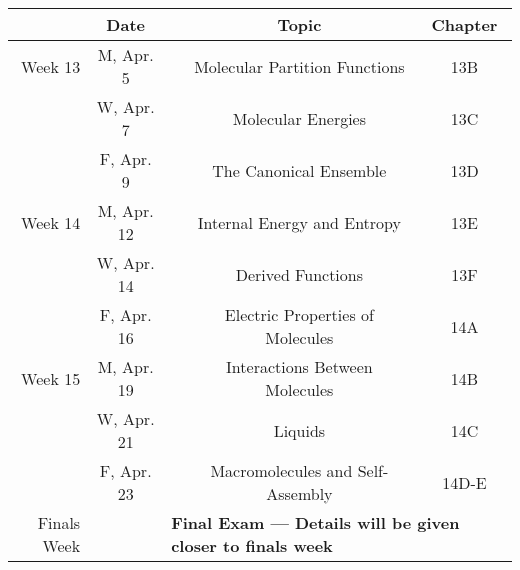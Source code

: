 \documentclass[12pt, letterpaper]{article}
\begin{document}
\noindent
\begin{tabular}{rcccc}
	& Date && Topic & Chapter\\
	\midrule
	Week 13 & M, Apr. 5&& Molecular Partition Functions & 13B\\
	& W, Apr. 7&& Molecular Energies & 13C\\
	& F, Apr. 9&& The Canonical Ensemble & 13D\\
	\midrule
	Week 14 & M, Apr. 12&& Internal Energy and Entropy & 13E\\
	& W, Apr. 14&& Derived Functions & 13F\\
	& F, Apr. 16&& Electric Properties of Molecules & 14A\\
	\midrule
	Week 15 & M, Apr. 19&& Interactions Between Molecules & 14B\\
	& W, Apr. 21&& Liquids & 14C\\
	& F, Apr. 23&& Macromolecules and Self-Assembly & 14D-E\\
	\midrule
	Finals Week& & \multicolumn{3}{l}{\textbf{Final Exam --- Details will be given closer to finals week}}\\
\end{tabular}
\end{document}
